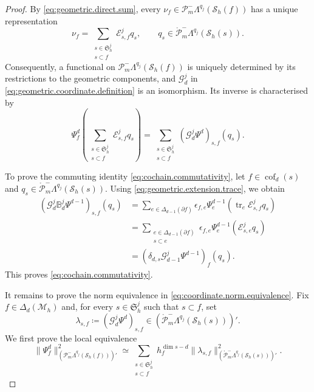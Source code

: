 \documentclass[a4paper,11pt]{article}
\theoremstyle{definition}
\newcommand{\Mh}{\mathcal{M}_h}
\newcommand{\Sh}{\mathcal{S}_h}
\newcommand{\FM}[1]{\Delta_{#1}}
\newcommand{\cof}[1]{\operatorname{cof}_{#1}}
\newcommand{\PLtrim}[2]{\mathcal{P}_{#1}^{-}\Lambda^{#2}}
\newcommand{\trc}{\operatorname{tr}}
\newcommand{\PLtrimz}[2]{\mathring{\mathcal P}_{#1}^{-}\Lambda^{#2}}
\begin{document}
\begin{proof}
By \eqref{eq:geometric.direct.sum}, every $\nu_f\in\PLtrim{m}{q_j}(\Sh(f))$ has a unique representation
\[
\nu_f
=
\sum_{\substack{
s\in\mathfrak S_h^j\\
s\subset f
}}
\mathcal E_{s,f}^jq_s,
\qquad
q_s\in\PLtrimz{m}{q_j}(\Sh(s)).
\]
Consequently, a functional on $\PLtrim{m}{q_j}(\Sh(f))$ is uniquely determined by its restrictions to the geometric components, and $\mathcal G_d^j$ in \eqref{eq:geometric.coordinate.definition} is an isomorphism.
Its inverse is characterised by
\[
\Psi_f^d
\left(
\sum_{\substack{
s\in\mathfrak S_h^j\\
s\subset f
}}
\mathcal E_{s,f}^jq_s
\right)
=
\sum_{\substack{
s\in\mathfrak S_h^j\\
s\subset f
}}
\left(
\mathcal G_d^j\Psi^d
\right)_{s,f}(q_s).
\]

To prove the commuting identity \eqref{eq:cochain.commutativity}, let $f\in\cof{d}(s)$ and $q_s\in\PLtrimz{m}{q_j}(\Sh(s))$.
Using \eqref{eq:geometric.extension.trace}, we obtain
\[
\begin{aligned}
\left(
\mathcal G_d^j\mathbb B_d^j\Psi^{d-1}
\right)_{s,f}(q_s)
&=
\sum_{e\in\FM{d-1}(\partial f)}
\epsilon_{f,e}
\Psi_e^{d-1}
\left(
\trc_e\mathcal E_{s,f}^jq_s
\right)
\\
&=
\sum_{\substack{
e\in\FM{d-1}(\partial f)\\
s\subset e
}}
\epsilon_{f,e}
\Psi_e^{d-1}
\left(
\mathcal E_{s,e}^jq_s
\right)
\\
&=
\left(
\delta_{d,s}\mathcal G_{d-1}^j\Psi^{d-1}
\right)_f(q_s).
\end{aligned}
\]
This proves \eqref{eq:cochain.commutativity}.

It remains to prove the norm equivalence in \eqref{eq:coordinate.norm.equivalence}.
Fix $f\in\FM{d}(\Mh)$ and, for every $s\in\mathfrak S_h^j$ such that $s\subset f$, set
\[
\lambda_{s,f}
\coloneqq
\left(
\mathcal G_d^j\Psi^d
\right)_{s,f}
\in
\left(
\PLtrimz{m}{q_j}(\Sh(s))
\right)'.
\]
We first prove the local equivalence
\begin{equation}\label{eq:local.coordinate.norm.equivalence}
\|\Psi_f^d\|_{(\PLtrim{m}{q_j}(\Sh(f)))'}^2
\simeq
\sum_{\substack{
s\in\mathfrak S_h^j\\
s\subset f
}}
h_f^{\dim s-d}
\|\lambda_{s,f}\|_
{\left(\PLtrimz{m}{q_j}(\Sh(s))\right)'}^2.
\end{equation}


\end{proof}
\end{document}
